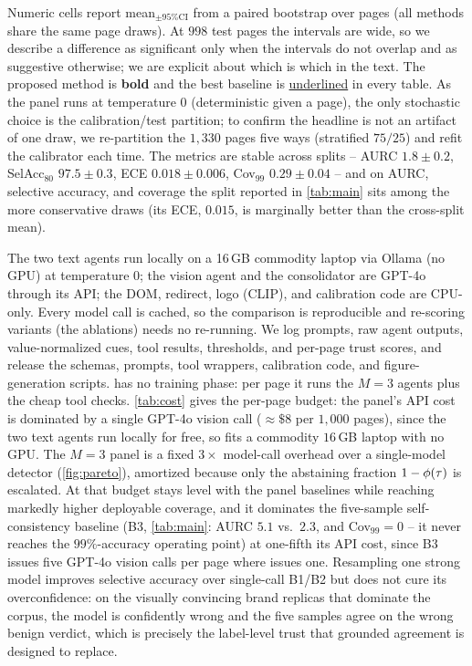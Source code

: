 Numeric cells report mean$_{\pm\text{95\% CI}}$ from a paired bootstrap over pages
(all methods share the same page draws). At $998$ test pages the intervals are wide, so
we describe a difference as significant only when the intervals do not overlap and as
suggestive otherwise; we are explicit about which is which in the text. The proposed
method is \textbf{bold} and the best baseline is \underline{underlined} in every table.
As the panel runs at temperature $0$ (deterministic given a page), the only stochastic
choice is the calibration/test partition; to confirm the headline is not an artifact of one
draw, we re-partition the $1{,}330$ pages five ways (stratified $75/25$) and refit the
calibrator each time. The metrics are stable across splits -- AURC $1.8\pm0.2$,
SelAcc$_{80}$ $97.5\pm0.3$, ECE $0.018\pm0.006$, Cov$_{99}$ $0.29\pm0.04$ -- and on AURC,
selective accuracy, and coverage the split reported in \autoref{tab:main} sits among the more
conservative draws (its ECE, $0.015$, is marginally better than the cross-split mean).

The two text agents run locally on a 16\,GB commodity laptop via Ollama (no GPU) at
temperature $0$; the vision agent and the consolidator are GPT-4o through its API; the
DOM, redirect, logo (CLIP), and calibration code are CPU-only. Every model call is cached,
so the comparison is reproducible and re-scoring variants (the ablations) needs no
re-running. We log prompts, raw agent outputs, value-normalized cues, tool results,
thresholds, and per-page trust scores, and release the schemas, prompts, tool wrappers,
calibration code, and figure-generation scripts. \toolname{} has no training phase: per
page it runs the $M{=}3$ agents plus the cheap tool checks. \autoref{tab:cost} gives the
per-page budget: the panel's API cost is dominated by a single GPT-4o vision call
($\approx\$8$ per $1{,}000$ pages), since the two text agents run locally for free, so
\toolname{} fits a commodity $16$\,GB laptop with no GPU. The $M{=}3$ panel is a fixed
$3\times$ model-call overhead over a single-model detector (\autoref{fig:pareto}), amortized
because only the abstaining fraction $1-\phi(\tau)$ is escalated. At that budget \toolname{} stays
level with the panel baselines while reaching markedly higher deployable coverage,
and it dominates the five-sample self-consistency baseline (B3, \autoref{tab:main}: AURC
$5.1$ vs.\ $2.3$, and Cov$_{99}{=}0$ -- it never reaches the $99\%$-accuracy operating point)
at one-fifth its API cost, since B3 issues five GPT-4o vision calls per page where \toolname{}
issues one. Resampling one strong model improves selective accuracy over single-call B1/B2 but
does not cure its overconfidence: on the visually convincing brand replicas that dominate the
corpus, the model is confidently wrong and the five samples agree on the wrong \textsf{benign}
verdict, which is precisely the label-level trust that grounded agreement is designed to
replace.



